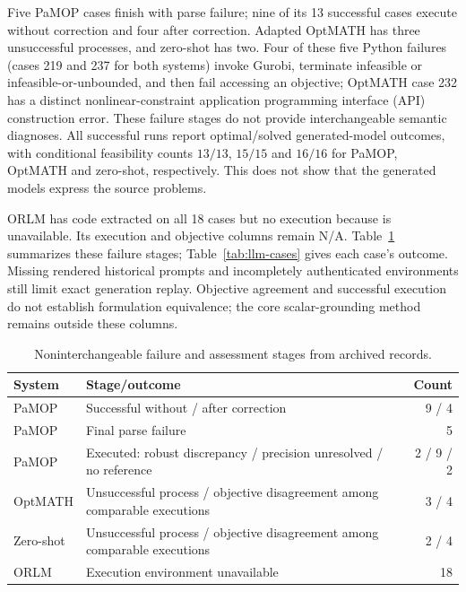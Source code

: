 Five PaMOP cases finish with parse failure; nine of its 13 successful cases execute without correction and four after correction. Adapted OptMATH has three unsuccessful processes, and zero-shot has two. Four of these five Python failures (cases 219 and 237 for both systems) invoke Gurobi, terminate infeasible or infeasible-or-unbounded, and then fail accessing an objective; OptMATH case 232 has a distinct nonlinear-constraint application programming interface (API) construction error. These failure stages do not provide interchangeable semantic diagnoses. All successful runs report optimal/solved generated-model outcomes, with conditional feasibility counts $13/13$, $15/15$ and $16/16$ for PaMOP, OptMATH and zero-shot, respectively. This does not show that the generated models express the source problems.

ORLM has code extracted on all 18 cases but no execution because  is unavailable. Its execution and objective columns remain N/A. Table~\ref{tab:llm-failures} summarizes these failure stages; Table~\ref{tab:llm-cases} gives each case's outcome. Missing rendered historical prompts and incompletely authenticated environments still limit exact generation replay. Objective agreement and successful execution do not establish formulation equivalence; the core scalar-grounding method remains outside these columns.


\begin{table}[htbp]\centering\small
\caption{Noninterchangeable failure and assessment stages from archived records.}\label{tab:llm-failures}
\begin{tabularx}{\linewidth}{@{}lXr@{}}\toprule
System & Stage/outcome & Count\\\midrule
PaMOP & Successful without / after correction & 9 / 4\\
PaMOP & Final parse failure & 5\\
PaMOP & Executed: robust discrepancy / precision unresolved / no reference & 2 / 9 / 2\\
OptMATH & Unsuccessful process / objective disagreement among comparable executions & 3 / 4\\
Zero-shot & Unsuccessful process / objective disagreement among comparable executions & 2 / 4\\
ORLM & Execution environment unavailable & 18\\\bottomrule
\end{tabularx}\end{table}

